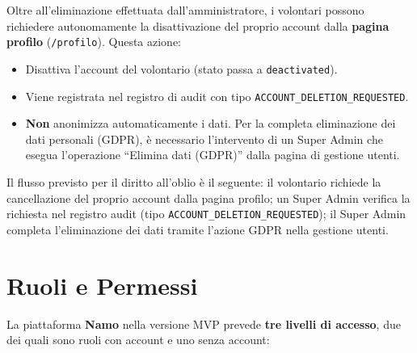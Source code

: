 \documentclass[a4paper,11pt,oneside]{book}
\newcommand{\namo}{\textbf{Namo}}
\newcommand{\percorso}[1]{\textcolor{namoCyan}{\texttt{#1}}}
\begin{document}
Oltre all'eliminazione effettuata dall'amministratore, i volontari possono richiedere autonomamente la disattivazione del proprio account dalla \textbf{pagina profilo} (\percorso{/profilo}). Questa azione:

\begin{itemize}[leftmargin=1.5em]
  \item Disattiva l'account del volontario (stato passa a \texttt{deactivated}).
  \item Viene registrata nel registro di audit con tipo \texttt{ACCOUNT\_DELETION\_REQUESTED}.
  \item \textbf{Non} anonimizza automaticamente i dati. Per la completa eliminazione dei dati personali (GDPR), \`e necessario l'intervento di un Super Admin che esegua l'operazione ``Elimina dati (GDPR)'' dalla pagina di gestione utenti.
\end{itemize}

\begin{infobox}
Il flusso previsto per il diritto all'oblio \`e il seguente: il volontario richiede la cancellazione del proprio account dalla pagina profilo; un Super Admin verifica la richiesta nel registro audit (tipo \texttt{ACCOUNT\_DELETION\_REQUESTED}); il Super Admin completa l'eliminazione dei dati tramite l'azione GDPR nella gestione utenti.
\end{infobox}

\section{Ruoli e Permessi}
\label{sec:ruoli-permessi}

La piattaforma \namo{} nella versione MVP prevede \textbf{tre livelli di accesso}, due dei quali sono ruoli con account e uno senza account:
\end{document}
